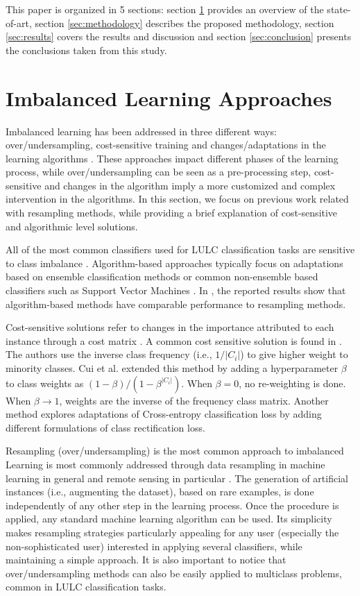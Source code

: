\documentclass[parskip=full]{scrartcl}
\begin{document}
This paper is organized in 5 sections: section \ref{sec:sota} provides an
overview of the state-of-art, section \ref{sec:methodology} describes the
proposed methodology, section \ref{sec:results} covers the results and
discussion and section \ref{sec:conclusion} presents the conclusions taken from
this study.

\section{Imbalanced Learning Approaches} \label{sec:sota}

Imbalanced learning has been addressed in three different ways:
over/undersampling, cost-sensitive training and changes/adaptations in the
learning algorithms \cite{Kaur2019}. These approaches impact different
phases of the learning process, while over/undersampling can be seen as a
pre-processing step, cost-sensitive and changes in the algorithm imply a more
customized and complex intervention in the algorithms. In this
section, we focus on previous work related with resampling methods, while
providing a brief explanation of cost-sensitive and algorithmic level solutions.

All of the most common classifiers used for LULC classification tasks
\cite{Khatami2016, Gavade2019} are sensitive to class imbalance
\cite{Blagus2010}. Algorithm-based approaches typically focus on adaptations
based on ensemble classification methods \cite{Mellor2015} or common
non-ensemble based classifiers such as Support Vector Machines \cite{Shao2014}.
In \cite{Lee2016}, the reported results show that algorithm-based methods have
comparable performance to resampling methods.

Cost-sensitive solutions refer to changes in the importance attributed to each
instance through a cost matrix \cite{Huang2016,Cui2019,Dong2017}. A common cost
sensitive solution is found in \cite{Huang2016}. The authors use the inverse
class frequency (i.e., $1/|C_i|$) to give higher weight to minority classes. Cui
et al. \cite{Cui2019} extended this method by adding a hyperparameter $\beta$ to
class weights as $(1-\beta)/(1-\beta^{|C_i|})$. When $\beta=0$, no re-weighting
is done. When $\beta\rightarrow 1$, weights are the inverse of the frequency
class matrix. Another method \cite{Dong2017} explores adaptations of
Cross-entropy classification loss by adding different formulations of class
rectification loss.

Resampling (over/undersampling) is the most common approach to imbalanced
Learning is most commonly addressed through data resampling in machine learning
in general and remote sensing in particular \cite{Feng2019}. The generation of
artificial instances (i.e., augmenting the dataset), based on rare examples, is
done independently of any other step in the learning process. Once the procedure
is applied, any standard machine learning algorithm can be used. Its
simplicity makes resampling strategies particularly appealing for any user
(especially the non-sophisticated user) interested in applying several
classifiers, while maintaining a simple approach.
It is also important to notice that over/undersampling methods can also be
easily applied to multiclass problems, common in LULC classification tasks.
\end{document}
